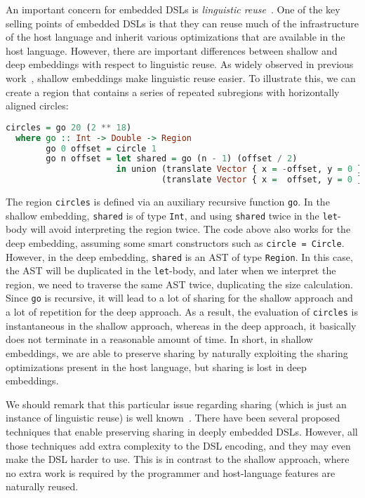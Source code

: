 An important concern for embedded DSLs is \emph{linguistic
reuse}~\citep{krishnamurthi2001linguistic}. One of the key selling points of
embedded DSLs is that they can reuse much of the infrastructure of the host
language and inherit various optimizations that are available in the host
language. However, there are important differences between shallow and deep
embeddings with respect to linguistic reuse. As widely observed in previous
work~\citep{rompf2012scala,jovanovic2014yinyang,svenningsson2015combining},
shallow embeddings make linguistic reuse easier. To illustrate this, we can
create a region that contains a series of repeated subregions with horizontally
aligned circles:

\begin{lstlisting}[language=Haskell,deletekeywords={union,intersect}]
circles = go 20 (2 ** 18)
  where go :: Int -> Double -> Region
        go 0 offset = circle 1
        go n offset = let shared = go (n - 1) (offset / 2)
                      in union (translate Vector { x = -offset, y = 0 } shared)
                               (translate Vector { x =  offset, y = 0 } shared)
\end{lstlisting}

\noindent
The region \lstinline{circles} is defined via an auxiliary recursive function
\lstinline{go}. In the shallow embedding, \lstinline{shared} is of type
\lstinline{Int}, and using \lstinline{shared} twice in the \lstinline{let}-body
will avoid interpreting the region twice. The code above also works for the deep
embedding, assuming some smart constructors such as \lstinline{circle = Circle}.
However, in the deep embedding, \lstinline{shared} is an AST of type
\lstinline{Region}. In this case, the AST will be duplicated in the
\lstinline{let}-body, and later when we interpret the region, we need to
traverse the same AST twice, duplicating the size calculation. Since
\lstinline{go} is recursive, it will lead to a lot of sharing for the shallow
approach and a lot of repetition for the deep approach. As a result, the
evaluation of \lstinline{circles} is instantaneous in the shallow approach,
whereas in the deep approach, it basically does not terminate in a reasonable
amount of time. In short, in shallow embeddings, we are able to preserve sharing
by naturally exploiting the sharing optimizations present in the host language,
but sharing is lost in deep embeddings.

We should remark that this particular issue regarding sharing (which is just an
instance of linguistic reuse) is well
known~\citep{gill2009type,kiselyov2011implementing,oliveira2013abstract}. There
have been several proposed techniques that enable preserving sharing in deeply
embedded DSLs. However, all those techniques add extra complexity to the DSL
encoding, and they may even make the DSL harder to use. This is in contrast to
the shallow approach, where no extra work is required by the programmer and
host-language features are naturally reused.

